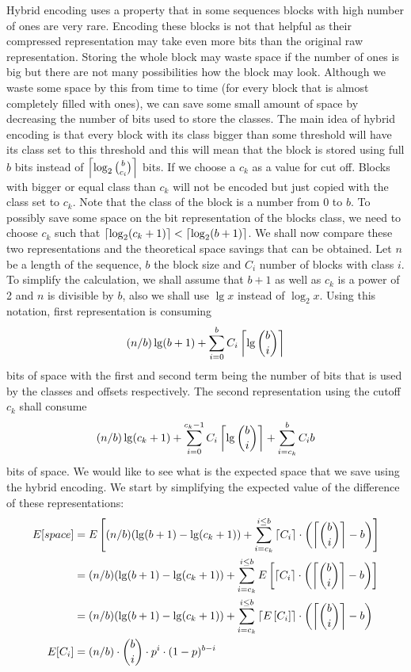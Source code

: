 Hybrid encoding uses a property that in some sequences blocks with high number
of ones are very rare. Encoding these blocks is not that helpful as their
compressed representation may take even more bits than the original raw
representation. Storing the whole block may waste space if the number of
ones is big but there are not many possibilities how the block may look.
Although we waste some space by this from time to time (for every
block that is almost completely filled with ones), we can save some small
amount of space by decreasing the number of bits used to store the classes.
The main idea of hybrid encoding is that every block with its
class bigger than some threshold will have its class set to this threshold
and this will mean that the block is stored using full $b$ bits instead of
$\left\lceil \log_2{b\choose c_i} \right\rceil$ bits. If we choose a $c_k$ as a value for cut off.
Blocks with bigger or equal class than $c_k$ will not be encoded but just
copied with the class set to $c_k$. Note that the class of the block
is a number from 0 to $b$. To possibly save some space on the bit representation
of the blocks class, we need to choose $c_k$ such that $\left\lceil \log_2(c_k+1) \right\rceil < \left\lceil \log_2(b+1) \right\rceil$.
We shall now compare these two representations and the theoretical space savings that
can be obtained. Let $n$ be a length of the sequence, $b$ the block size and $C_i$
number of blocks with class $i$. To simplify the calculation, we shall assume that $b+1$
as well as $c_k$ is a power of 2 and $n$ is divisible by $b$, also we shall
use $\lg x$ instead of $\log_2 x$. Using this notation, first representation is
consuming $$(n/b)\lg (b+1) + \sum_{i=0}^{b} C_i\left\lceil \lg {b\choose i} \right\rceil$$
bits of space with the first and second term being the number of bits that
is used by the classes and offsets respectively. The second representation
using the cutoff $c_k$ shall consume $$(n/b)\lg (c_k+1)+\sum_{i=0}^{c_k-1}C_i\left\lceil \lg {b\choose i} \right\rceil + \sum_{i=c_k}^{b}C_i b$$
bits of space. We would like to see what is the expected space that we save
using the hybrid encoding. We start by simplifying the expected value of the
difference of these representations:
\begin{align} 
E[space] &= E\left[(n/b)(\lg(b+1)-\lg(c_k+1)) + \sum_{i=c_k}^{i\leq b}\left\lceil C_i \right\rceil\cdot \left(\left\lceil {b\choose i} \right\rceil - b\right)\right] \nonumber\\
&=(n/b)(\lg(b+1)-\lg(c_k+1)) + \sum_{i=c_k}^{i\leq b}E\left[\left\lceil C_i \right\rceil\cdot \left(\left\lceil {b\choose i} \right\rceil - b\right)\right] \nonumber\\
&=(n/b)(\lg(b+1)-\lg(c_k+1)) + \sum_{i=c_k}^{i\leq b}\left\lceil E\left[C_i\right] \right\rceil\cdot \left(\left\lceil {b\choose i} \right\rceil - b\right) \nonumber\\
E[C_i] &= (n/b)\cdot {b\choose i}\cdot p^i\cdot (1-p)^{b-i} \label{eq:hybrid_encoding_expected_c_i}
\end{align}

